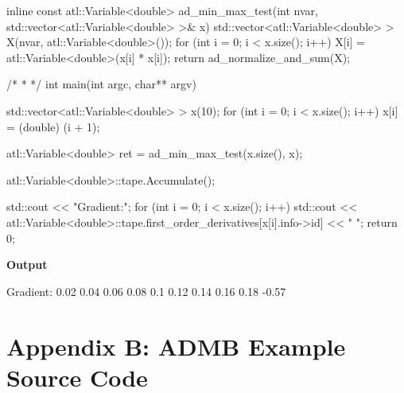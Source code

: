 \documentclass[oneside]{article}
\begin{document}
\begin{cppsource}

inline const atl::Variable<double> ad_min_max_test(int nvar,
std::vector<atl::Variable<double> >& x) {
    std::vector<atl::Variable<double> > X(nvar, atl::Variable<double>());
    for (int i = 0; i < x.size(); i++) {
        X[i] = atl::Variable<double>(x[i] * x[i]);
    }
    return ad_normalize_and_sum(X);
}

/*
 *
 */
int main(int argc, char** argv) {

    std::vector<atl::Variable<double> > x(10);
    for (int i = 0; i < x.size(); i++) {
        x[i] = (double) (i + 1);
    }

    atl::Variable<double> ret = ad_min_max_test(x.size(), x);

    atl::Variable<double>::tape.Accumulate();

    std::cout << "Gradient:\n";
    for (int i = 0; i < x.size(); i++) {
        std::cout <<
        atl::Variable<double>::tape.first_order_derivatives[x[i].info->id] << " ";
    }
    return 0;
}

\end{cppsource}

\textbf{Output}
\begin{myoutput}
Gradient:
0.02 0.04 0.06 0.08 0.1 0.12 0.14 0.16 0.18 -0.57
\end{myoutput}

\section{Appendix B: ADMB Example Source Code}
\end{document}
